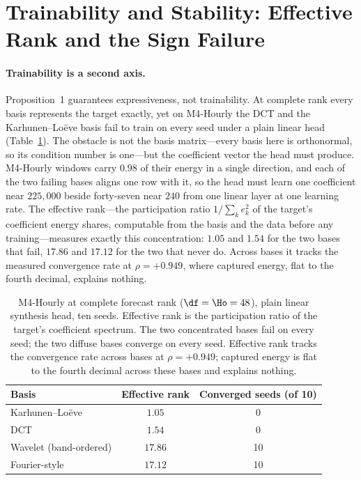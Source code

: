 \section{Trainability and Stability: Effective Rank and the Sign Failure}\label{sec:trainability}

\paragraph{Trainability is a second axis.}
Proposition~1 guarantees expressiveness, not trainability. At complete rank every basis
represents the target exactly, yet on M4-Hourly the DCT and the Karhunen--Lo\"eve basis fail to
train on every seed under a plain linear head (Table~\ref{tab:effective_rank}). The obstacle is
not the basis matrix---every basis here is orthonormal, so its condition number is one---but the
coefficient vector the head must produce. M4-Hourly windows carry $0.98$ of their energy in a
single direction, and each of the two failing bases aligns one row with it, so the head must
learn one coefficient near $225{,}000$ beside forty-seven near $240$ from one linear layer at
one learning rate. The effective rank---the participation ratio $1/\sum_k e_k^2$ of the target's
coefficient energy shares, computable from the basis and the data before any training---measures
exactly this concentration: $1.05$ and $1.54$ for the two bases that fail, $17.86$ and $17.12$
for the two that never do. Across bases it tracks the measured convergence rate at
$\rho = +0.949$, where captured energy, flat to the fourth decimal, explains nothing.

\begin{table}[t]
  \centering
  \caption{M4-Hourly at complete forecast rank ($\df = \Ho = 48$), plain linear synthesis head,
  ten seeds. Effective rank is the participation ratio of the target's coefficient spectrum. The
  two concentrated bases fail on every seed; the two diffuse bases converge on every seed.
  Effective rank tracks the convergence rate across bases at $\rho = +0.949$; captured energy is
  flat to the fourth decimal across these bases and explains nothing.}
  \label{tab:effective_rank}
  \begin{tabular}{lcc}
    \toprule
    Basis & Effective rank & Converged seeds (of 10) \\
    \midrule
    Karhunen--Lo\"eve   & $1.05$  & 0 \\
    DCT                 & $1.54$  & 0 \\
    Wavelet (band-ordered) & $17.86$ & 10 \\
    Fourier-style       & $17.12$ & 10 \\
    \bottomrule
  \end{tabular}
\end{table}

